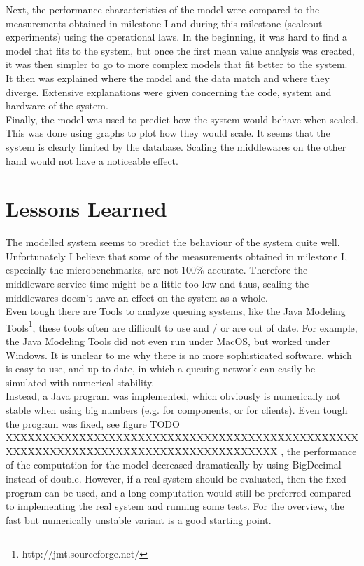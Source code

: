 \documentclass[a4paper]{article}
\begin{document}
Next, the performance characteristics of the model were compared to the measurements obtained in milestone I\cite{milestone1} and during this milestone (scaleout experiments) using the operational laws. In the beginning, it was hard to find a model that fits to the system, but once the first mean value analysis was created, it was then simpler to go to more complex models that fit better to the system.\\

It then was explained where the model and the data match and where they diverge. Extensive explanations were given concerning the code, system and hardware of the system.\\

Finally, the model was used to predict how the system would behave when scaled. This was done using graphs to plot how they would scale. It seems that the system is clearly limited by the database. Scaling the middlewares on the other hand would not have a noticeable effect.\\


\pagebreak

\section{Lessons Learned}

The modelled system seems to predict the behaviour of the system quite well. Unfortunately I believe that some of the measurements obtained in milestone I\cite{milestone1}, especially the microbenchmarks, are not 100\% accurate. Therefore the middleware service time might be a little too low and thus, scaling the middlewares doesn't have an effect on the system as a whole.\\

Even tough there are Tools to analyze queuing systems, like the Java Modeling Tools\footnote{http://jmt.sourceforge.net/}, these tools often are difficult to use and / or are out of date. For example, the Java Modeling Tools did not even run under MacOS, but worked under Windows. It is unclear to me why there is no more sophisticated software, which is easy to use, and up to date, in which a queuing network can easily be simulated with numerical stability.\\

Instead, a Java program was implemented, which obviously is numerically not stable when using big numbers (e.g. for components, or for clients). Even tough the program was fixed, see figure  TODO XXXXXXXXXXXXXXXXXXXXXXXXXXXXXXXXXXXXXXXXXXXXXXXXXXXXXXXXXXXXXXXXXXXXXXXXXXXXXXXXXXXXX
, the performance of the computation for the model decreased dramatically by using BigDecimal instead of double. However, if a real system should be evaluated, then the fixed program can be used, and a long computation would still be preferred compared to implementing the real system and running some tests. For the overview, the fast but numerically unstable variant is a good starting point.\\
\end{document}
